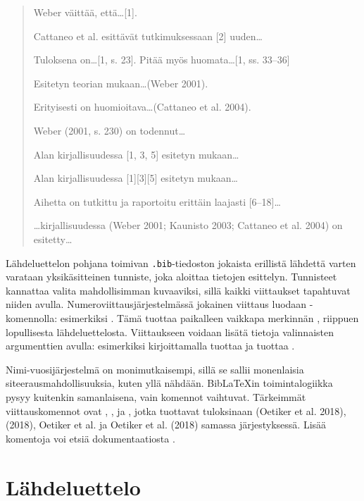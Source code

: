 \begin{quotation}
\noindent Weber väittää, että\ldots [1].

\noindent Cattaneo et al. esittävät tutkimuksessaan [2] uuden\ldots

\noindent Tuloksena on\ldots [1, s. 23]. Pitää myös huomata\ldots [1, ss. 33--36]

\noindent Esitetyn teorian mukaan\ldots (Weber 2001).

\noindent Erityisesti on huomioitava\ldots (Cattaneo et al. 2004).

\noindent Weber (2001, s. 230) on todennut\ldots

\noindent Alan kirjallisuudessa [1, 3, 5] esitetyn mukaan\ldots

\noindent Alan kirjallisuudessa [1][3][5] esitetyn mukaan\ldots

\noindent Aihetta on tutkittu ja raportoitu erittäin laajasti [6--18]\ldots

\noindent\ldots kirjallisuudessa (Weber 2001; Kaunisto 2003; Cattaneo et al. 2004) on esitetty\ldots
\end{quotation}

Lähdeluettelon pohjana toimivan \texttt{.bib}-tiedoston jokaista erillistä lähdettä varten varataan yksikäsitteinen tunniste, joka aloittaa tietojen esittelyn. Tunnisteet kannattaa valita mahdollisimman kuvaaviksi, sillä kaikki viittaukset tapahtuvat niiden avulla. Numeroviittausjärjestelmässä jokainen viittaus luodaan -komennolla: esimerkiksi . Tämä tuottaa paikalleen vaikkapa merkinnän \cite{notsoshort}, riippuen lopullisesta lähdeluettelosta. Viittaukseen voidaan lisätä tietoja valinnaisten argumenttien avulla: esimerkiksi kirjoittamalla  tuottaa \cite[s. 30]{notsoshort} ja  tuottaa \cite[katso][s. 30]{notsoshort}.

Nimi-vuosijärjestelmä on monimutkaisempi, sillä se sallii monenlaisia siteerausmahdollisuuksia, kuten yllä nähdään. Bib\LaTeX{}in toimintalogiikka pysyy kuitenkin samanlaisena, vain komennot vaihtuvat. Tärkeimmät viittauskomennot ovat , ,  ja , jotka tuottavat tuloksinaan (Oetiker et al. 2018), (2018), Oetiker et al. ja Oetiker et al. (2018) samassa järjestyksessä.  Lisää komentoja voi etsiä dokumentaatiosta \parencite{biblatex}.

\section{Lähdeluettelo}

